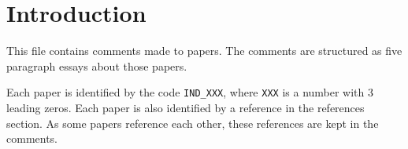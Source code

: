 \section{Introduction}

This file contains comments made to papers. The comments are structured as five
paragraph essays about those papers.

Each paper is identified by the code \texttt{IND\_XXX}, where \texttt{XXX} is a
number with 3 leading zeros. Each paper is also identified by a reference in
the references section. As some papers reference each other, these references
are kept in the comments.
